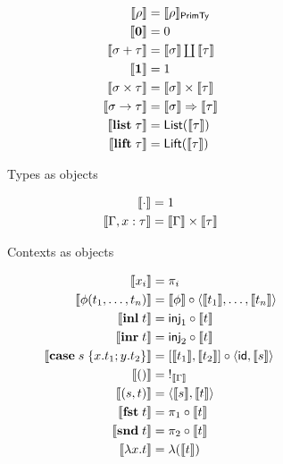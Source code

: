 \begin{figure}
\begin{subfigure}[t]{0.47\linewidth}
  \small
  \begin{align*}
  \llbracket \rho \rrbracket &= \llbracket \rho \rrbracket_{\mathsf{PrimTy}}
  \\
  \llbracket \mathbf{0} \rrbracket &= 0
  \\
  \llbracket \sigma + \tau \rrbracket &= \textstyle {\llbracket \sigma \rrbracket} \coprod {\llbracket \tau \rrbracket}
  \\
  \llbracket \mathbf{1} \rrbracket &= 1
  \\
  \llbracket \sigma \times \tau \rrbracket &= \llbracket \sigma \rrbracket \times \llbracket \tau \rrbracket
  \\
  \llbracket \sigma \to \tau \rrbracket &= \llbracket \sigma \rrbracket \Rightarrow \llbracket \tau \rrbracket
  \\
  \llbracket \mathbf{list}\;\tau \rrbracket &= \mathsf{List}(\llbracket \tau \rrbracket)
  \\
  \llbracket \mathbf{lift}\;\tau \rrbracket &= \mathsf{Lift}(\llbracket \tau \rrbracket)
  \end{align*}
  \caption{Types as objects}
  \label{fig:semantics:types}
\end{subfigure}%
\begin{subfigure}[t]{0.47\linewidth}
  \small
  \begin{align*}
  \llbracket \cdot \rrbracket &= 1
  \\
  \llbracket \Gamma, x: \tau \rrbracket &= \llbracket \Gamma \rrbracket \times \llbracket \tau \rrbracket
  \end{align*}
  \caption{Contexts as objects}
  \label{fig:semantics:contexts}
\end{subfigure}
\begin{subfigure}{0.8\linewidth}
  \small
  \begin{align*}
  \sem{x_i} &= \pi_i
  \\
  \sem{\phi(t_1, \ldots, t_n)}
  &=
  \sem{\phi} \comp \prodM{\sem{t_1}}{\ldots, \sem{t_n}}
  \\
  \sem{\tmInl{t}} &= \mathsf{inj}_1 \comp \sem{t}
  \\
  \sem{\tmInr{t}} &= \mathsf{inj}_2 \comp \sem{t}
  \\
  \sem{\tmCase{s}{x}{t_1}{y}{t_2}} &= \coprodM{\sem{t_1}}{\sem{t_2}} \comp \prodM{\id}{\sem{s}}
  \\
  \sem{\tmUnit} &=\;!_{\sem{\Gamma}}
  \\
  \sem{\tmPair{s}{t}} &= \prodM{\sem{s}}{\sem{t}}
  \\
  \sem{\tmFst{t}} &= \pi_1 \comp \sem{t}
  \\
  \sem{\tmSnd{t}} &= \pi_2 \comp \sem{t}
  \\
  \sem{\tmFun{x}{t}} &= \lambda(\sem{t})
  \\

\end{align*}
\end{subfigure}
\end{figure}
